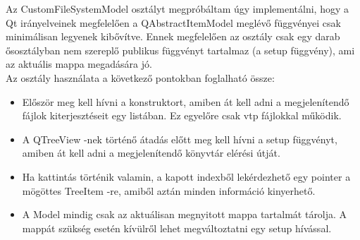 
\vspace{3mm}

\begin{sloppypar}
Az {\ttfamily CustomFileSystemModel} osztályt megpróbáltam úgy implementálni,  
hogy a Qt irányelveinek megfelelően 
a {\ttfamily QAbstractItemModel} meglévő függvényei 
csak minimálisan legyenek kibővítve. 
Ennek megfelelően az osztály csak egy darab ősosztályban 
nem szereplő publikus függvényt tartalmaz (a {\ttfamily setup} függvény), 
ami az aktuális mappa megadására jó. 
\\
Az osztály használata a következő pontokban foglalható össze: 
\end{sloppypar}

\begin{itemize}
\item
Először meg kell hívni a konstruktort, 
amiben át kell adni a megjelenítendő fájlok kiterjesztéseit egy listában. 
Ez egyelőre csak vtp fájlokkal működik.
\item
A {\ttfamily QTreeView} -nek történő átadás előtt 
meg kell hívni a {\ttfamily setup} függvényt, 
amiben át kell adni a megjelenítendő könyvtár elérési útját.
\item
Ha kattintás történik valamin, 
a kapott indexből lekérdezhető egy pointer 
a mögöttes {\ttfamily TreeItem} -re, 
amiből aztán minden információ kinyerhető.
\item
A Model mindig csak az aktuálisan megnyitott mappa tartalmát tárolja. 
A mappát szükség esetén kívülről lehet megváltoztatni
egy {\ttfamily setup} hívással.
\end{itemize}

